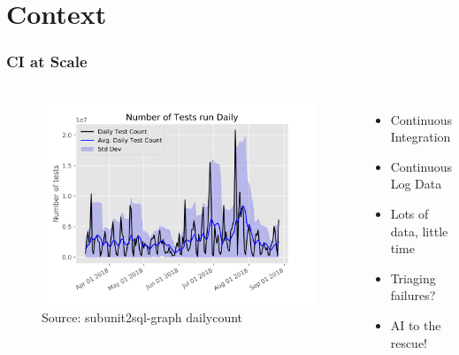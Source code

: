 \documentclass[aspectratio=169,11pt,hyperref={colorlinks=true}]{beamer}
\begin{document}
\section{Context}

\begin{frame}
  \frametitle{CI at Scale}
  \begin{columns}
      \begin{figure}
      \begin{center}
        \includegraphics[width=1\textwidth]{graphs/daily_count.png}
           \caption{Source: subunit2sql-graph dailycount}
      \end{center}
      \end{figure}
      \begin{itemize}
          \item{Continuous Integration}
          \item{Continuous Log Data}
          \item{Lots of data, little time}
          \item{Triaging failures?}
          \item{AI to the rescue!}
      \end{itemize}
  \end{columns}
\end{frame}
\end{document}
